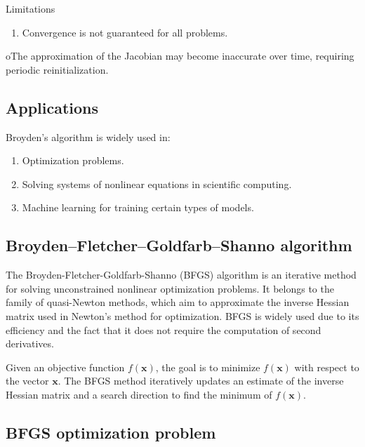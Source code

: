 \documentclass[%
oneside,                 %
final,                   %
10pt]{article}
\begin{document}
\begin{block}{Limitations }
\begin{enumerate}
\item Convergence is not guaranteed for all problems.
\end{enumerate}

\noindent
oThe approximation of the Jacobian may become inaccurate over time, requiring periodic reinitialization.
\end{block}

\subsection{Applications}

Broyden’s algorithm is widely used in:
\begin{enumerate}
\item Optimization problems.

\item Solving systems of nonlinear equations in scientific computing.

\item Machine learning for training certain types of models.
\end{enumerate}

\noindent
\subsection{Broyden–Fletcher–Goldfarb–Shanno algorithm}

The Broyden-Fletcher-Goldfarb-Shanno (BFGS) algorithm is an iterative
method for solving unconstrained nonlinear optimization problems. It
belongs to the family of quasi-Newton methods, which aim to
approximate the inverse Hessian matrix used in Newton's method for
optimization. BFGS is widely used due to its efficiency and the fact
that it does not require the computation of second derivatives.

Given an objective function \( f(\mathbf{x}) \), the goal is to
minimize \( f(\mathbf{x}) \) with respect to the vector \( \mathbf{x}
\). The BFGS method iteratively updates an estimate of the inverse
Hessian matrix and a search direction to find the minimum of \(
f(\mathbf{x}) \).

\subsection{BFGS optimization problem}
\end{document}
